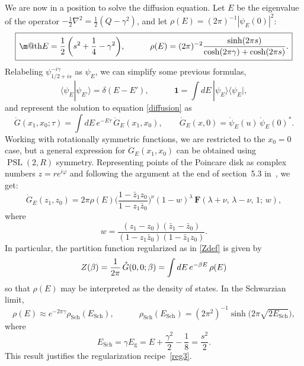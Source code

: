 \documentclass[11pt]{article}
\makeatletter
\newcommand*{\wideboxed}[1]{\setlength{\fboxsep}{1ex}%
  \fbox{\m@th$\displaystyle#1$}}
\newcommand{\hgfs}{\mathbf{F}}
\newcommand{\lt}{\left}
\newcommand{\rt}{\right}
\newcommand*{\bra}[1]{\langle{#1}|}
\newcommand*{\ket}[1]{|{#1}\rangle}
\newcommand*{\braket}[2]{\langle{#1}|{#2}\rangle}
\newcommand{\vp}{\varphi}
\newcommand{\RR}{\mathbb{R}}
\DeclareMathOperator{\PSL}{PSL}
\DeclareMathOperator{\Sch}{Sch}
\newcommand{\g}{\text{g}}
\newcommand{\unit}{\mathbf{1}}
\newcommand{\rpsi}{\mathring{\psi}}
\newcommand{\rG}{\mathring{G}}
\newcommand{\ov}{\over}
\def\RR{R}
\makeatother
\begin{document}
We are now in a position to solve the diffusion equation. Let $E$ be the eigenvalue of the operator $-\frac{1}{2}\nabla^2=\frac{1}{2}(Q-\gamma^2)$, and
let $\rho(E)=(2\pi)^{-1}|\psi_E(0)|^2$:
\begin{equation} \label{E&rho}
\wideboxed{
E=\frac{1}{2}\,\biggl(s^2+\frac{1}{4}-\gamma^2\biggr),\qquad\quad
\rho(E)=(2\pi)^{-2}\frac{\sinh(2\pi s)}{\cosh(2\pi\gamma)+\cosh(2\pi s)}.
}
\end{equation}
Relabeling $\psi^{-i\gamma}_{1/2+is}$ as $\psi_{E}$, we can simplify some previous formulas,
\begin{equation}
\braket{\psi_{E}}{\psi_{E'}}=\delta(E-E'),\qquad\quad
\unit=\int dE\, \ket{\psi_{E}}\bra{\psi_{E}},
\end{equation}
and represent the solution to equation \eqref{diffusion} as
\begin{equation} \label{Eucprop}
\rG(x_1,x_0;\tau)=\int dE\,e^{-E\tau}\,\rG_{E}(x_1,x_0),\qquad
\rG_{E}(x,0)=\rpsi_{E}(u)\,\rpsi_{E}(0)^{*}.
\end{equation}
Working with rotationally symmetric functions, we are restricted to the $x_0=0$ case, but a general expression for $\rG_{E}(x_1,x_0)$ can be obtained using $\PSL(2,\RR)$ symmetry. Representing points of the Poincare disk as complex numbers $z=re^{i\vp}$ and following the argument at the end of section~5.3 in~\cite{SL2R}, we get:
\begin{equation}
\rG_{E}(z_1,z_0)=2\pi\rho(E)
\biggl(\frac{1-\bar{z}_1z_0}{1-z_1\bar{z}_0}\biggr)^{\nu}(1-w)^{\lambda}\,
\hgfs(\lambda+\nu,\,\lambda-\nu,\,1;\,w),
\end{equation}
where
\begin{equation}
w=\frac{(z_1-z_0)(\bar{z}_1-\bar{z}_0)}{(1-z_1\bar{z}_0)(1-\bar{z}_1z_0)}.
\end{equation}
In particular, the partition function regularized as in \eqref{Zdef} is given by
\begin{equation} \label{Zbeta}
Z(\beta)={1 \ov 2 \pi}\,\rG(0,0;\beta)=\int dE\, e^{-\beta E}\,\rho(E)
\end{equation}
so that $\rho(E)$ may be interpreted as the density of states. In the Schwarzian limit,
\begin{equation}\label{rho_rhoSch}
\rho(E)\approx e^{-2\pi\gamma}\rho_{\Sch}(E_{\Sch}),\qquad\quad
\rho_{\Sch}(E_{\Sch})=\lt(2\pi^2\rt)^{-1}\sinh\biggl(2\pi\sqrt{2E_{\Sch}}\biggr),
\end{equation}
where
\begin{equation} \label{Egsrel}
E_{\Sch} = \gamma E_{\g} = E+\frac{\gamma^2}{2}-\frac{1}{8} =\frac{s^2}{2}.
\end{equation}
This result justifies the regularization recipe~\ref{reg3}.
\end{document}
